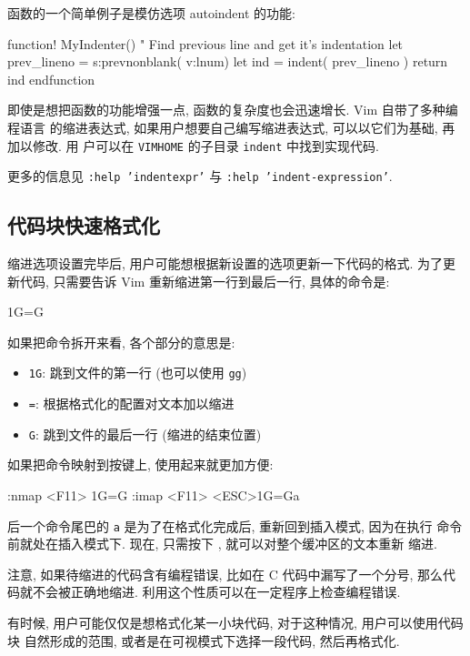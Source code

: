 函数的一个简单例子是模仿选项 autoindent 的功能:
\begin{vimcode}
function! MyIndenter()
   " Find previous line and get it's indentation
   let prev_lineno = s:prevnonblank( v:lnum)
   let ind = indent( prev_lineno )
   return ind
endfunction
\end{vimcode}

即使是想把函数的功能增强一点, 函数的复杂度也会迅速增长. Vim 自带了多种编程语言
的缩进表达式, 如果用户想要自己编写缩进表达式, 可以以它们为基础, 再加以修改. 用
户可以在 \texttt{VIMHOME} 的子目录 \texttt{indent} 中找到实现代码.

更多的信息见 \texttt{:help 'indentexpr'} 与 \texttt{:help 'indent-expression'}.

\subsection{代码块快速格式化}
\label{subsec:fast_code_block_formatting}

缩进选项设置完毕后, 用户可能想根据新设置的选项更新一下代码的格式. 为了更新代码,
只需要告诉 Vim 重新缩进第一行到最后一行, 具体的命令是:
\begin{vimcode}
1G=G
\end{vimcode}
如果把命令拆开来看, 各个部分的意思是:
\begin{itemize}
    \item \texttt{1G}: 跳到文件的第一行 (也可以使用 \texttt{gg})
    \item \texttt{=}: 根据格式化的配置对文本加以缩进
    \item \texttt{G}: 跳到文件的最后一行 (缩进的结束位置)
\end{itemize}

如果把命令映射到按键上, 使用起来就更加方便:
\begin{vimcode}
:nmap <F11> 1G=G
:imap <F11> <ESC>1G=Ga
\end{vimcode}
后一个命令尾巴的 \texttt{a} 是为了在格式化完成后, 重新回到插入模式, 因为在执行
命令前就处在插入模式下. 现在, 只需按下 , 就可以对整个缓冲区的文本重新
缩进.

\begin{warning}
    注意, 如果待缩进的代码含有编程错误, 比如在 C 代码中漏写了一个分号, 那么代
    码就不会被正确地缩进. 利用这个性质可以在一定程序上检查编程错误.
\end{warning}

有时候, 用户可能仅仅是想格式化某一小块代码, 对于这种情况, 用户可以使用代码块
自然形成的范围, 或者是在可视模式下选择一段代码, 然后再格式化.

